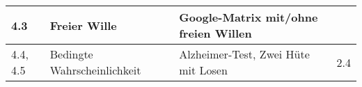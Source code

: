 \begin{center}
\begin{tabular}{|p{1.4cm}|p{5cm}|p{9cm}|p{1.8cm}|}
\hline
4.3 & Freier Wille & Google-Matrix mit/ohne freien Willen & \\
\hline 
4.4, 4.5 & Bedingte Wahrscheinlichkeit & Alzheimer-Test, Zwei Hüte mit Losen &
2.4 \\
\hline
\end{tabular}

\end{center}
